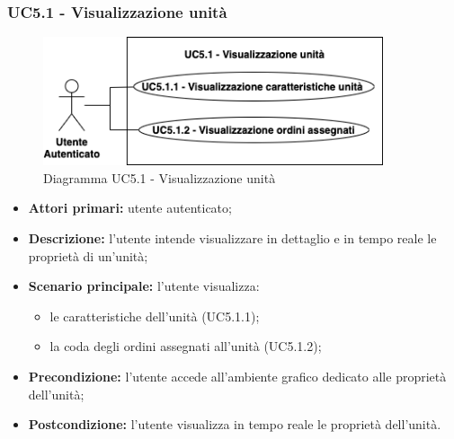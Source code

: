     \subsubsection{UC5.1 - Visualizzazione unità}
    \begin{figure}[h!]
        \centering
        \includegraphics[width=10cm]{images/uc5.1.png}
        \caption{Diagramma UC5.1 - Visualizzazione unità}
    \end{figure}
    \begin{itemize}
        \item \textbf{Attori primari:} utente autenticato;
        \item \textbf{Descrizione:} l'utente intende visualizzare in dettaglio e in tempo reale le proprietà di un'unità;
        \item \textbf{Scenario principale:} l'utente visualizza:
        \begin{itemize}
            \item le caratteristiche dell'unità (UC5.1.1);
            \item la coda degli ordini assegnati all'unità (UC5.1.2);
        \end{itemize}
        \item \textbf{Precondizione:} l'utente accede all'ambiente grafico dedicato alle proprietà dell'unità;
        \item \textbf{Postcondizione:} l'utente visualizza in tempo reale le proprietà dell'unità.
    \end{itemize}


